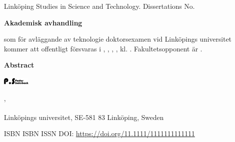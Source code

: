 \documentclass[12pt, a5paper]{article}
\begin{document}
\pagestyle{empty}

\begin{center}
\fontsize{10}{12}\selectfont Linköping Studies in Science and Technology. Dissertations No. \Number

\fontsize{14}{16.8}\selectfont\textbf{\MainTitleThesis}

\fontsize{11}{13.2}\selectfont \SecondaryTitleThesis

\fontsize{14}{16.8}\selectfont \Author

\fontsize{10}{12}\selectfont\textbf{Akademisk avhandling}
\end{center}
\fontsize{9}{10.2}\selectfont
som för avläggande av teknologie doktorsexamen vid Linköpings uni\-versitet kommer att offentligt försvaras i \roomForDefence, \houseForDefence, \campusForDefence, \cityForDefence, \dateForDefence{ }kl. \clockForDefence. Fakultetsopponent är \opponentTitel{ }\opponent.

\begin{center}
\fontsize{10}{12}\selectfont\textbf{Abstract}
\end{center}

\fontsize{9}{10.2}\selectfont


\vfill
\begin{center}
\includegraphics[width=0.5\linewidth]{../Logos/blackLogo.pdf}
\end{center}

\begin{center}
\fontsize{10}{12}\selectfont
\phdStudentDivisionSwedish,\\
\phdStudentDepartmentSwedish \\
Linköpings universitet, SE-581 83 Linköping, Sweden
\end{center}
\fontsize{10}{12}\selectfont
ISBN \isbnPrint{ }\newline
ISBN \isbnPdf \newline 
ISSN \issn \newline
DOI: \href{https://doi.org/11.1111/1111111111111}{https://doi.org/11.1111/1111111111111}
\end{document}
